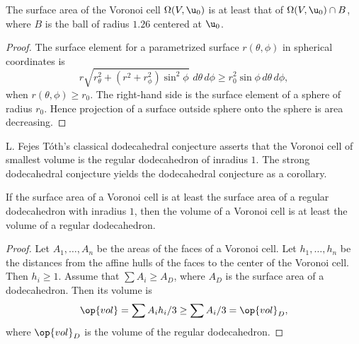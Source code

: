 \begin{lemma}[]
  The surface area of the Voronoi cell $\Omega(V, \u_0)$ is at least
  that of $\Omega(V, \u_0)\cap B$, where $B$ is the ball of radius
  $1.26$ centered at $ \u_0$.
\end{lemma}
%
%

\begin{proof} The surface element for a parametrized surface
  $r(\theta,\phi)$ in spherical coordinates is
\begin{displaymath}
%
  r \sqrt{r_\theta^2 + (r^2 + r_\phi^2)\sin^2\phi } \,\,d\theta\,d\phi 
\ge r_0^2 \sin\phi\, d\theta\,d\phi,
\end{displaymath}
when $r(\theta,\phi)\ge r_0$.  The right-hand side is the surface
element of a sphere of radius $r_0$.  Hence projection of a surface
outside sphere onto the sphere is area decreasing.
\end{proof}


L. Fejes T\'oth's classical dodecahedral conjecture asserts that the
Voronoi cell of smallest volume is the regular dodecahedron of
inradius $1$.  %
%
The strong dodecahedral conjecture yields the dodecahedral conjecture
as a corollary.

\begin{lemma}[]
  If the surface area of a Voronoi cell is at least the surface area
  of a regular dodecahedron with inradius $1$, then the volume of a
  Voronoi cell is at least the volume of a regular dodecahedron.
\end{lemma}

\begin{proof} Let $A_1,\ldots,A_n$ be the areas of the faces of a
  Voronoi cell.  Let $h_1,\ldots,h_n$ be the distances from the affine hulls of the faces
  to the center of the Voronoi cell.  Then $h_i\ge 1$.  Assume that
  $\sum A_i \ge A_D$, where $A_D$ is the surface area of a dodecahedron.
  Then its volume is
\begin{displaymath}
\op{vol} = \sum A_i h_i/3 \ge \sum A_i/3 = \op{vol}_D,
\end{displaymath}
where $\op{vol}_D$ is the volume of the regular dodecahedron.
\end{proof}
%
%
%


